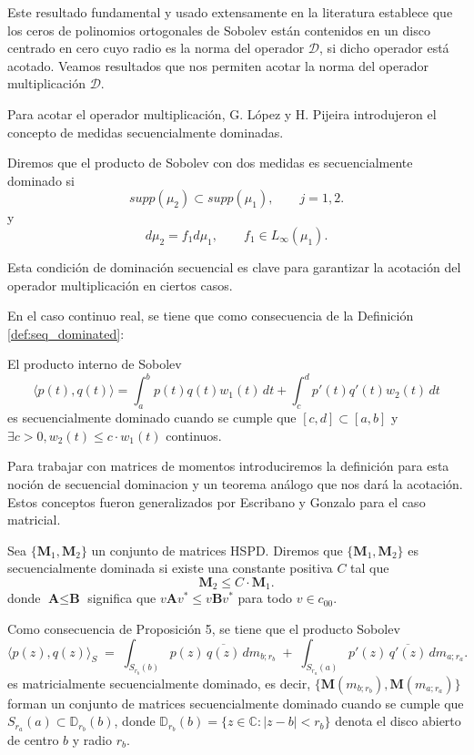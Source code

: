 Este resultado fundamental y usado extensamente en la literatura establece que los ceros de polinomios ortogonales de Sobolev están contenidos en un disco centrado en cero cuyo radio es la norma del operador $\mathcal{D}$, si dicho operador está acotado. Veamos resultados que nos permiten acotar la norma del operador multiplicación $\mathcal{D}$.

Para acotar el operador multiplicación, G. López y H. Pijeira \cite{lagomasino1999zero} introdujeron el concepto de medidas secuencialmente dominadas.

\begin{definition}
	\cite{lagomasino1999zero} Diremos que el producto de Sobolev con dos medidas es secuencialmente dominado si
	$$supp(\mu_2) \subset supp(\mu_{1}) , \qquad j = 1,2.$$ y
	$$d\mu_2 = f_{1}d\mu_{1}, \qquad f_{1} \in L_{\infty}(\mu_{1}).$$
\end{definition}

Esta condición de dominación secuencial es clave para garantizar la acotación del operador multiplicación en ciertos casos.

En el caso continuo real, se tiene que como consecuencia de la Definición \ref{def:seq_dominated}:

\begin{corollary}
	El producto interno de Sobolev
	$$\langle p(t), q(t) \rangle = \int_{a}^{b} p(t) q(t) w_1(t) \, dt + \int_{c}^{d} p'(t) q'(t) w_2(t) \, dt$$
	es secuencialmente dominado cuando se cumple que $[c,d] \subset [a,b]$ y $\exists c > 0, w_2(t)\leq c \cdot w_1(t)$ continuos.
\end{corollary}

Para trabajar con matrices de momentos introduciremos la definición para esta noción de secuencial dominacion y un teorema análogo que nos dará la acotación. Estos conceptos fueron generalizados por Escribano y Gonzalo \cite{escribano2025boundedness} para el caso matricial.

\begin{definition}\label{def:seq_dominated}
	\cite{escribano2025boundedness} Sea $\{\textbf{M}_1,\textbf{M}_2\}$ un conjunto de matrices HSPD. Diremos que $\{\textbf{M}_1,\textbf{M}_2\}$ es secuencialmente dominada si existe una constante positiva $C$ tal que
	$$\textbf{M}_2 \leq C \cdot \textbf{M}_{1}.$$
	donde $\textbf{A} \leq \textbf{B}$ significa que $v\textbf{A}v^* \leq v\textbf{B}v^*$ para todo $v \in c_{00}$.
\end{definition}

Como consecuencia de \cite{escribano2025zeros} Proposición 5, se tiene que el producto Sobolev
$$\langle p(z) , q(z) \rangle_{S}\;=\;
	\int_{S_{r_b}(b)} p(z)\,\overline{q(z)} \, dm_{b;r_b}
	\;+\;
	\int_{S_{r_a}(a)} p'(z)\,\overline{q'(z)} \, dm_{a;r_a}.$$
es matricialmente secuencialmente dominado, es decir, $\{\textbf{M}(m_{b;r_b}),\textbf{M}(m_{a;r_a})\}$ forman un conjunto de matrices secuencialmente dominado cuando se cumple que $S_{r_a}(a)\subset \mathbb{D}_{r_b}(b)$, donde $\mathbb{D}_{r_b}(b) = \{z \in \mathbb{C} : |z - b| < r_b\}$ denota el disco abierto de centro $b$ y radio $r_b$.


